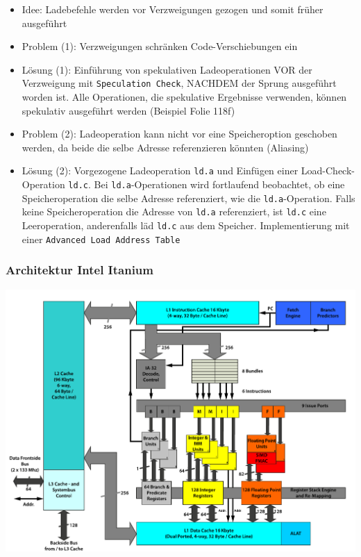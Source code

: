 \begin{itemize}
\begin{itemize}
		\item Idee: Ladebefehle werden vor Verzweigungen gezogen und somit früher ausgeführt
		\item Problem (1): Verzweigungen schränken Code-Verschiebungen ein
		\item Lösung (1): Einführung von spekulativen Ladeoperationen VOR der Verzweigung mit \texttt{Speculation Check}, NACHDEM der Sprung ausgeführt worden ist. Alle Operationen, die spekulative Ergebnisse verwenden, können spekulativ ausgeführt werden (Beispiel Folie 118f)
		\item Problem (2): Ladeoperation kann nicht vor eine Speicheroption geschoben werden, da beide die selbe Adresse referenzieren könnten (Aliasing)
		\item Lösung (2): Vorgezogene Ladeoperation \texttt{ld.a} und Einfügen einer Load-Check-Operation \texttt{ld.c}. Bei \texttt{ld.a}-Operationen wird fortlaufend beobachtet, ob eine Speicheroperation die selbe Adresse referenziert, wie die \texttt{ld.a}-Operation. Falls keine Speicheroperation die Adresse von \texttt{ld.a} referenziert, ist \texttt{ld.c} eine Leeroperation, anderenfalls läd \texttt{ld.c} aus dem Speicher. Implementierung mit einer \texttt{Advanced Load Address Table}
	\end{itemize}
\end{itemize}

\subsubsection{Architektur Intel Itanium}
\includegraphics[scale=0.68]{mikroprozessoren2/Itanium_architecture.pdf}



